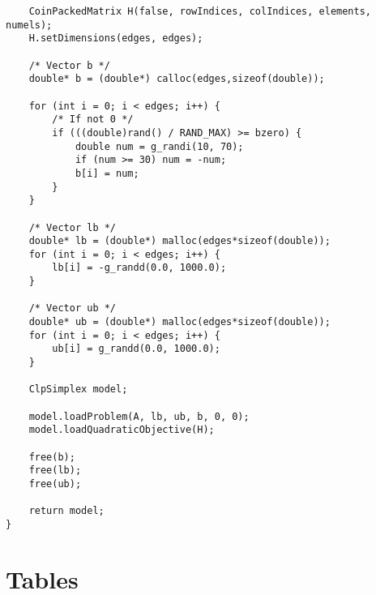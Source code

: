 \begin{verbatim}
    CoinPackedMatrix H(false, rowIndices, colIndices, elements, numels);
    H.setDimensions(edges, edges);

    /* Vector b */
    double* b = (double*) calloc(edges,sizeof(double));

    for (int i = 0; i < edges; i++) {
        /* If not 0 */
        if (((double)rand() / RAND_MAX) >= bzero) {
            double num = g_randi(10, 70);
            if (num >= 30) num = -num;
            b[i] = num;
        }
    }

    /* Vector lb */
    double* lb = (double*) malloc(edges*sizeof(double));
    for (int i = 0; i < edges; i++) {
        lb[i] = -g_randd(0.0, 1000.0);
    }

    /* Vector ub */
    double* ub = (double*) malloc(edges*sizeof(double));
    for (int i = 0; i < edges; i++) {
        ub[i] = g_randd(0.0, 1000.0);
    }

    ClpSimplex model;

    model.loadProblem(A, lb, ub, b, 0, 0);
    model.loadQuadraticObjective(H);

    free(b);
    free(lb);
    free(ub);

    return model;
}
\end{verbatim}

\section{Tables}
